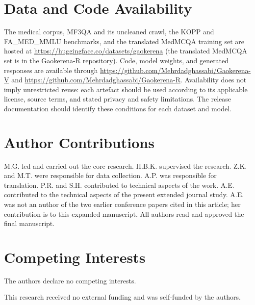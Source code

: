 \documentclass[manuscript,screen,review]{acmart}
\begin{document}
\section*{Data and Code Availability}

The medical corpus, MF3QA and its uncleaned crawl, the KOPP and FA\_MED\_MMLU benchmarks, and the translated MedMCQA training set are hosted at \url{https://huggingface.co/datasets/gaokerena} (the translated MedMCQA set is in the Gaokerena-R repository). Code, model weights, and generated responses are available through \url{https://github.com/Mehrdadghassabi/Gaokerena-V} and \url{https://github.com/Mehrdadghassabi/Gaokerena-R}. Availability does not imply unrestricted reuse: each artefact should be used according to its applicable license, source terms, and stated privacy and safety limitations. The release documentation should identify these conditions for each dataset and model.

\section*{Author Contributions}
M.G. led and carried out the core research. H.B.K. supervised the research. Z.K. and M.T. were responsible for data collection. A.P. was responsible for translation. P.R. and S.H. contributed to technical aspects of the work. A.E. contributed to the technical aspects of the present extended journal study. A.E. was not an author of the two earlier conference papers cited in this article; her contribution is to this expanded manuscript. All authors read and approved the final manuscript.

\section*{Competing Interests}
The authors declare no competing interests.

\begin{acks}
This research received no external funding and was self-funded by the authors.
\end{acks}
\end{document}
